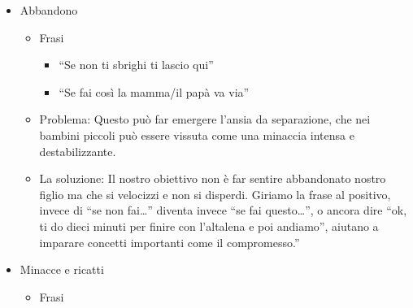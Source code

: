 \documentclass[12pt]{book} %
\begin{document}
\begin{itemize}
\item Abbandono

\begin{itemize}
\item Frasi

\begin{itemize}
\item “Se non ti sbrighi ti lascio qui”
\item “Se fai così la mamma/il papà va via”
\end{itemize}
\item Problema: Questo può far emergere l’ansia da separazione, che nei bambini piccoli può essere vissuta come una minaccia intensa e destabilizzante.
\item La soluzione: Il nostro obiettivo non è far sentire abbandonato nostro figlio ma che si velocizzi e non si
disperdi. Giriamo la frase al positivo, invece di “se non fai…” diventa invece “se fai questo…”, o ancora dire “ok, ti
do dieci minuti per finire con l'altalena e poi andiamo”, aiutano a imparare concetti importanti
come il compromesso.”
\end{itemize}
\item Minacce e ricatti

\begin{itemize}
\item Frasi


\end{itemize}
\end{itemize}
\end{document}
